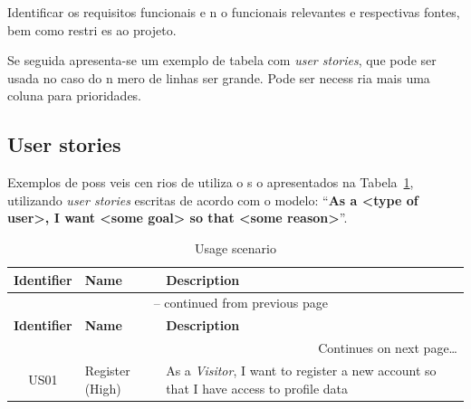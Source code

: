 \documentclass{article}
\begin{document}
\begin{info}
Identificar os requisitos funcionais e n o funcionais relevantes e respectivas fontes, bem como restri es ao projeto.

Se seguida apresenta-se um exemplo de tabela com \textit{user stories}, que pode ser usada no caso do n mero de linhas ser grande.
Pode ser necess ria mais uma coluna para prioridades.
\end{info}

\subsection*{User stories}

Exemplos de poss veis cen rios de utiliza o s o apresentados na Tabela~\ref{tab:userstories}, utilizando \textit{user stories} escritas de acordo com o modelo: 
``\textbf{As a <type of user>, I want <some goal> so that <some reason>}''.

\begin{center}
\begin{longtable}{| c | p{18mm} | p{110mm} |}
\caption{Usage scenario} \label{tab:userstories} \\[-2mm] \hline

\textbf{Identifier} & \textbf{Name} & \textbf{Description} \\ \hline\hline
\endfirsthead

\multicolumn{3}{c}{{\tablename\ \thetable{} -- continued from previous page}} \\[2mm] \hline
\textbf{Identifier} & \textbf{Name} & \textbf{Description} \\ \hline\hline
\endhead

\multicolumn{3}{r}{{Continues on next page\ldots}} \\
\endfoot

\hline
\endlastfoot

US01 & Register (High) & As a \textit{Visitor}, I want to register a new account so that I have access to profile data  \\ \hline

% 

\end{longtable}
\end{center}
\end{document}
